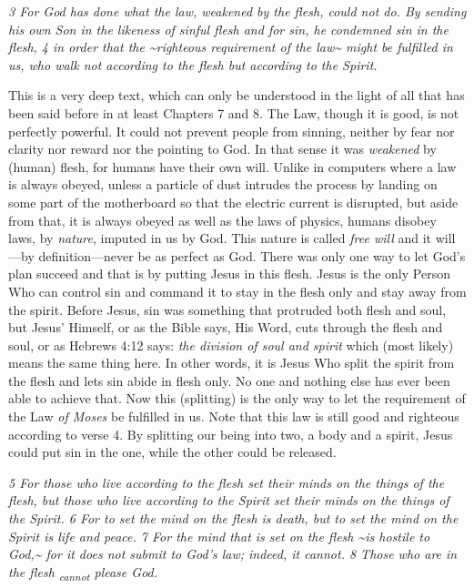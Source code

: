 \emph{3 For God has done what the law, weakened by the flesh, could not
do. By sending his own Son in the likeness of sinful flesh and for sin,
he condemned sin in the flesh, 4 in order that the
\textasciitilde righteous requirement of the law\textasciitilde{} might
be fulfilled in us, who walk not according to the flesh but according to
the Spirit.}

This is a very deep text, which can only be understood in the light of
all that has been said before in at least Chapters 7 and 8. The Law,
though it is good, is not perfectly powerful. It could not prevent
people from sinning, neither by fear nor clarity nor reward nor the
pointing to God. In that sense it was \emph{weakened} by (human) flesh,
for humans have their own will. Unlike in computers where a law is
always obeyed, unless a particle of dust intrudes the process by landing
on some part of the motherboard so that the electric current is
disrupted, but aside from that, it is always obeyed as well as the laws
of physics, humans disobey laws, by \emph{nature}, imputed in us by God.
This nature is called \emph{free will} and it will---by
definition---never be as perfect as God. There was only one way to let
God's plan succeed and that is by putting Jesus in this flesh. Jesus is
the only Person Who can control sin and command it to stay in the flesh
only and stay away from the spirit. Before Jesus, sin was something that
protruded both flesh and soul, but Jesus' Himself, or as the Bible says,
His Word, cuts through the flesh and soul, or as Hebrews 4:12 says:
\emph{the division of soul and spirit} which (most likely) means the
same thing here. In other words, it is Jesus Who split the spirit from
the flesh and lets sin abide in flesh only. No one and nothing else has
ever been able to achieve that. Now this (splitting) is the only way to
let the requirement of the Law \emph{of Moses} be fulfilled in us. Note
that this law is still good and righteous according to verse 4. By
splitting our being into two, a body and a spirit, Jesus could put sin
in the one, while the other could be released.

\emph{5 For those who live according to the flesh set their minds on the
things of the flesh, but those who live according to the Spirit set
their minds on the things of the Spirit. 6 For to set the mind on the
flesh is death, but to set the mind on the Spirit is life and peace. 7
For the mind that is set on the flesh \textasciitilde is hostile to
God,\textasciitilde{} for it does not submit to God's law; indeed, it
cannot. 8 Those who are in the flesh \textsubscript{cannot} please God.}

